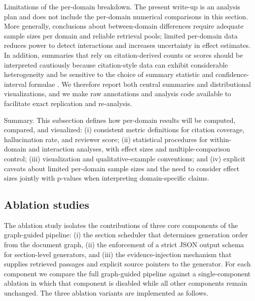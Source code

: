 \documentclass{article}%
\begin{document}
Limitations of the per-domain breakdown. The present write-up is an analysis plan and does not include the per-domain numerical comparisons in this section. More generally, conclusions about between-domain differences require adequate sample sizes per domain and reliable retrieval pools; limited per-domain data reduces power to detect interactions and increases uncertainty in effect estimates. In addition, summaries that rely on citation-derived counts or scores should be interpreted cautiously because citation-style data can exhibit considerable heterogeneity and be sensitive to the choice of summary statistic and confidence-interval formulae \cite{web_varin_2013_statistical_modelling_of_citation_exchange_betwee,web_adler_2009_citation_statistics,web_thelwall_2015_the_precision_of_the_arithmetic_mean_geometric_m}. We therefore report both central summaries and distributional visualizations, and we make raw annotations and analysis code available to facilitate exact replication and re-analysis.

Summary. This subsection defines how per-domain results will be computed, compared, and visualized: (i) consistent metric definitions for citation coverage, hallucination rate, and reviewer score; (ii) statistical procedures for within-domain and interaction analyses, with effect sizes and multiple-comparison control; (iii) visualization and qualitative-example conventions; and (iv) explicit caveats about limited per-domain sample sizes and the need to consider effect sizes jointly with p-values when interpreting domain-specific claims.%

%
\subsection{Ablation studies}%


%
The ablation study isolates the contributions of three core components of the graph-guided pipeline: (i) the section scheduler that determines generation order from the document graph, (ii) the enforcement of a strict JSON output schema for section-level generators, and (iii) the evidence-injection mechanism that supplies retrieved passages and explicit source pointers to the generator. For each component we compare the full graph-guided pipeline against a single-component ablation in which that component is disabled while all other components remain unchanged. The three ablation variants are implemented as follows.
\end{document}
